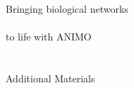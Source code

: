 \appendix
\clearpage
\setcounter{figure}{0}
\setcounter{table}{0}
\setcounter{page}{1}
\onecolumn



\newlength\addedmarginsingle
\setlength\addedmarginsingle{0.875in}
\newlength\addedmargintotal
\setlength\addedmargintotal{2\addedmarginsingle}

\addtolength{\oddsidemargin}{\addedmarginsingle}
\addtolength{\evensidemargin}{\addedmarginsingle}
\addtolength{\textwidth}{-\addedmargintotal}
\addtolength{\linewidth}{-\addedmargintotal}
\addtolength{\hsize}{-\addedmargintotal}
\addtolength{\topmargin}{\addedmarginsingle}
\addtolength{\textheight}{-\addedmargintotal}
\addtolength{\vsize}{-\addedmargintotal}

\pagestyle{plain}

\clearpage

\thispagestyle{empty}
\ \\ \ \\ \ \\ \ \\ \ \\
\begin{center}
 {\Huge Bringing biological networks}\\ \ \\ {\Huge to life with ANIMO}\\ \ \\ \ \\
 {\huge Additional Materials}
\end{center}
\clearpage






\makeatletter

